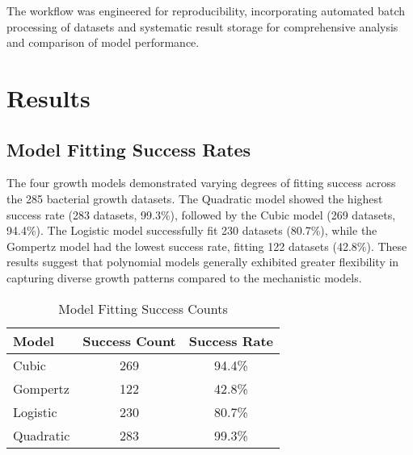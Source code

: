 \documentclass[11pt]{article}
\begin{document}
The workflow was engineered for reproducibility, incorporating automated batch processing of datasets and systematic result storage for comprehensive analysis and comparison of model performance.

\section{Results}

\subsection{Model Fitting Success Rates}
The four growth models demonstrated varying degrees of fitting success across the 285 bacterial growth datasets. The Quadratic model showed the highest success rate (283 datasets, 99.3\%), followed by the Cubic model (269 datasets, 94.4\%). The Logistic model successfully fit 230 datasets (80.7\%), while the Gompertz model had the lowest success rate, fitting 122 datasets (42.8\%). These results suggest that polynomial models generally exhibited greater flexibility in capturing diverse growth patterns compared to the mechanistic models.

\begin{table}[h]
    \centering
    \caption{Model Fitting Success Counts}
    \begin{tabular}{lcc}
        \toprule
        Model & Success Count & Success Rate \\
        \midrule
        Cubic & 269 & 94.4\% \\
        Gompertz & 122 & 42.8\% \\
        Logistic & 230 & 80.7\% \\
        Quadratic & 283 & 99.3\% \\
        \bottomrule
    \end{tabular}
\end{table}
\end{document}
